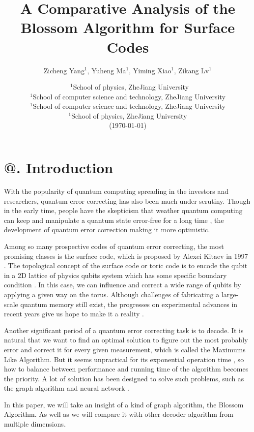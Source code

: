 \documentclass[
    a4paper, %
    10pt, %
    unnumberedsections, %
    twoside, %
]{LTJournalArticle}
\title{A Comparative Analysis of the Blossom Algorithm for Surface Codes} %
\author{
    Zicheng Yang$^1$, Yuheng Ma$^1$, Yiming Xiao$^1$, Zikang Lv$^1$
}
\date{\footnotesize\ $^1$School of physics, ZheJiang University \\ $^1$School of computer science and technology, ZheJiang University \\  $^1$School of computer science and technology, ZheJiang University \\  $^1$School of physics, ZheJiang University \\ (\today)}
\makeatletter
\newcommand{\Rmnum}[1]{\expandafter\@slowromancap\romannumeral #1@}
\makeatother
\begin{document}
\maketitle %


\section{\Rmnum{1}. Introduction}
With the popularity of quantum computing spreading in the investors and researchers, quantum error correcting has also been much under scrutiny. Though in the early time, people have the skepticism that weather quantum computing can keep and manipulate a quantum state error-free for a long time \cite{1}, the development of quantum error correction making it more optimistic.

Among so many prospective codes of quantum error correcting, the most promising classes is the surface code, which is proposed by Alexei Kitaev in 1997 \cite{2}. The topological concept of the surface code or toric code is to encode the qubit in a 2D lattice of physics qubits system which has some specific boundary condition \cite{3}. In this case, we can influence and correct a wide range of qubits by applying a given way on the torus. Although challenges of fabricating a large-scale quantum memory still exist, the progresses on experimental advances in recent years give us hope to make it a reality \cite{4}\cite{5}.

Another significant period of a quantum error correcting task is to decode. It is natural that we want to find an optimal solution to figure out the most probably error and correct it for every given measurement, which is called the Maximums Like Algorithm. But it seems unpractical for its exponential operation time \cite{6}, so how to balance between performance and running time of the algorithm becomes the priority. A lot of solution has been designed to solve such problems, such as the graph algorithm and neural network \cite{7}.

In this paper, we will take an insight of a kind of graph algorithm, the Blossom Algorithm. As well as we will compare it with other decoder algorithm from multiple dimensions.

\end{document}
